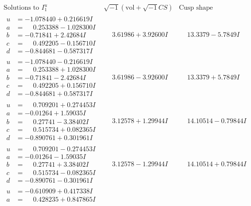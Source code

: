 \documentclass[1p]{elsarticle_modified}
\theoremstyle{definition}
\newcommand{\I}{\sqrt{-1}}
\begin{document}
$$\begin{array}{c|c|c}  
\text{Solutions to }I^u_{1}& \I (\text{vol} + \sqrt{-1}CS) & \text{Cusp shape}\\
 \hline 
\begin{aligned}
u &= -1.078440 + 0.216619 I \\
a &= \phantom{-}0.253388 - 1.028300 I \\
b &= -0.71841 + 2.42684 I \\
c &= \phantom{-}0.492205 - 0.156710 I \\
d &= -0.844681 - 0.587317 I\end{aligned}
 & \phantom{-}3.61986 + 3.92600 I & \phantom{-}13.3379 - 5.7849 I \\ \hline\begin{aligned}
u &= -1.078440 - 0.216619 I \\
a &= \phantom{-}0.253388 + 1.028300 I \\
b &= -0.71841 - 2.42684 I \\
c &= \phantom{-}0.492205 + 0.156710 I \\
d &= -0.844681 + 0.587317 I\end{aligned}
 & \phantom{-}3.61986 - 3.92600 I & \phantom{-}13.3379 + 5.7849 I \\ \hline\begin{aligned}
u &= \phantom{-}0.709201 + 0.274453 I \\
a &= -0.01264 + 1.59035 I \\
b &= \phantom{-}0.27741 - 3.38402 I \\
c &= \phantom{-}0.515734 + 0.082365 I \\
d &= -0.890761 + 0.301961 I\end{aligned}
 & \phantom{-}3.12578 + 1.29944 I & \phantom{-}14.10514 - 0.79844 I \\ \hline\begin{aligned}
u &= \phantom{-}0.709201 - 0.274453 I \\
a &= -0.01264 - 1.59035 I \\
b &= \phantom{-}0.27741 + 3.38402 I \\
c &= \phantom{-}0.515734 - 0.082365 I \\
d &= -0.890761 - 0.301961 I\end{aligned}
 & \phantom{-}3.12578 - 1.29944 I & \phantom{-}14.10514 + 0.79844 I \\ \hline\begin{aligned}
u &= -0.610909 + 0.417338 I \\
a &= \phantom{-}0.428235 + 0.847865 I \\

\end{aligned}
\end{array}$$
\end{document}
